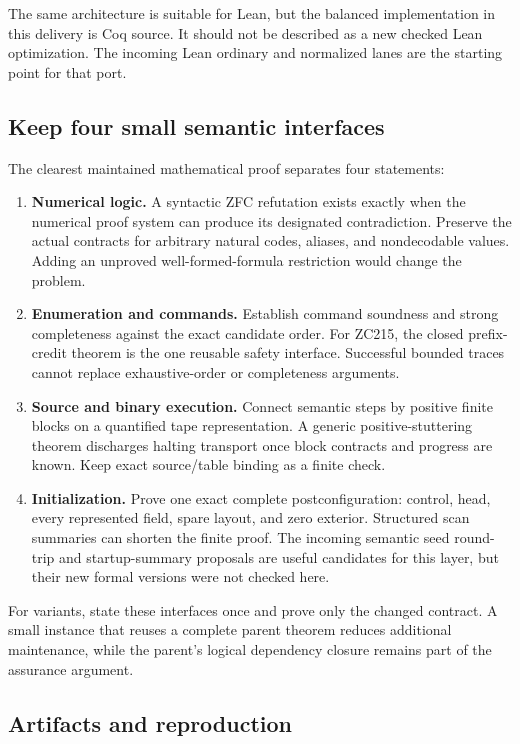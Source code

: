The same architecture is suitable for Lean, but the balanced implementation
in this delivery is Coq source. It should not be described as a new checked
Lean optimization. The incoming Lean ordinary and normalized lanes are the
starting point for that port.

\subsection{Keep four small semantic interfaces}

The clearest maintained mathematical proof separates four statements:
\begin{enumerate}
\item \textbf{Numerical logic.} A syntactic ZFC refutation exists exactly
when the numerical proof system can produce its designated contradiction.
Preserve the actual contracts for arbitrary natural codes, aliases, and
nondecodable values. Adding an unproved well-formed-formula restriction
would change the problem.
\item \textbf{Enumeration and commands.} Establish command soundness and
strong completeness against the exact candidate order. For ZC215, the
closed prefix-credit theorem is the one reusable safety interface.
Successful bounded traces cannot replace exhaustive-order or completeness
arguments.
\item \textbf{Source and binary execution.} Connect semantic steps by
positive finite blocks on a quantified tape representation. A generic
positive-stuttering theorem discharges halting transport once block
contracts and progress are known. Keep exact source/table binding as a
finite check.
\item \textbf{Initialization.} Prove one exact complete postconfiguration:
control, head, every represented field, spare layout, and zero exterior.
Structured scan summaries can shorten the finite proof. The incoming
semantic seed round-trip and startup-summary proposals are useful
candidates for this layer, but their new formal versions were not checked
here.
\end{enumerate}

For variants, state these interfaces once and prove only the changed
contract. A small instance that reuses a complete parent theorem reduces
additional maintenance, while the parent's
logical dependency closure remains part of the assurance argument.

\subsection{Artifacts and reproduction}

